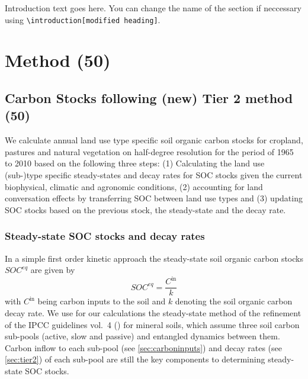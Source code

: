 \documentclass[gc, manuscript]{copernicus}
\begin{document}


\newpage

\introduction

Introduction text goes here.
You can change the name of the section if neccessary using \texttt{\textbackslash{}introduction{[}modified\ heading{]}}.
\newpage

\hypertarget{method-50}{%
\section{Method (50)}\label{method-50}}

\hypertarget{sec:carbonbudget}{%
\subsection{Carbon Stocks following (new) Tier 2 method (50)}\label{sec:carbonbudget}}

We calculate annual land use type specific soil organic carbon stocks for cropland, pastures and natural vegetation on half-degree resolution for the period of 1965 to 2010 based on the following three steps: (1) Calculating the land use (sub-)type specific steady-states and decay rates for SOC stocks given the current biophysical, climatic and agronomic conditions, (2) accounting for land conversation effects by transferring SOC between land use types and (3) updating SOC stocks based on the previous stock, the steady-state and the decay rate.

\hypertarget{steady-state-soc-stocks-and-decay-rates}{%
\subsubsection{Steady-state SOC stocks and decay rates}\label{steady-state-soc-stocks-and-decay-rates}}

In a simple first order kinetic approach the steady-state soil organic carbon stocks \(SOC^{eq}\) are given by
\begin{equation}
SOC^{eq} =\frac{C^{\textrm{in}}}{k}
\label{eq:inoutflow}
\end{equation}
with \(C^{\textrm{in}}\) being carbon inputs to the soil and \(k\) denoting the soil organic carbon decay rate. We use for our calculations the steady-state method of the refinement of the IPCC guidelines vol.~4 (\citet{ipcc_2019_2019}) for mineral soils, which assume three soil carbon sub-pools (active, slow and passive) and entangled dynamics between them. Carbon inflow to each sub-pool (see \ref{sec:carboninputs}) and decay rates (see \ref{sec:tier2}) of each sub-pool are still the key components to determining steady-state SOC stocks.
\end{document}
